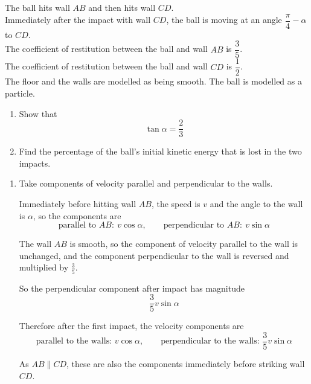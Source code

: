 \documentclass[leqno]{article}
\begin{document}
\begin{enumerate}[
  label=\textbf{\arabic*.},
  leftmargin=*,
  topsep=0pt,
  partopsep=0pt,
  parsep=0pt
]
The ball hits wall $AB$ and then hits wall $CD$. \\

Immediately after the impact with wall $CD$, the ball is moving at an angle $\dfrac{\pi}{4}-\alpha$ to $CD$. \\

The coefficient of restitution between the ball and wall $AB$ is $\dfrac{3}{5}$. \\

The coefficient of restitution between the ball and wall $CD$ is $\dfrac{1}{2}$. \\

The floor and the walls are modelled as being smooth. The ball is modelled as a particle. \\

\begin{enumerate}[label=\textbf{(\alph*)}]
  \item Show that
  \[
  \tan\alpha=\dfrac{2}{3}
  \] 
  \item Find the percentage of the ball's initial kinetic energy that is lost in the two impacts.  \\
\end{enumerate}

\vspace*{10pt}

\begin{djsSolution}
\begin{enumerate}[label=\textbf{(\alph*)}]
  \item Take components of velocity parallel and perpendicular to the walls.

  Immediately before hitting wall \(AB\), the speed is \(v\) and the angle to the wall is \(\alpha\), so the components are
  \[
  \text{parallel to }AB: \ v\cos\alpha,
  \qquad
  \text{perpendicular to }AB: \ v\sin\alpha
  \]

  The wall \(AB\) is smooth, so the component of velocity parallel to the wall is unchanged, and the component perpendicular to the wall is reversed and multiplied by \(\frac35\).

  So the perpendicular component after impact has magnitude
  \[
  \frac35 v\sin\alpha
  \]

  Therefore after the first impact, the velocity components are
  \[
  \text{parallel to the walls: } v\cos\alpha,
  \qquad
  \text{perpendicular to the walls: } \frac35 v\sin\alpha
  \]

  As \(AB\parallel CD\), these are also the components immediately before striking wall \(CD\).


\end{enumerate}
\end{djsSolution}
\end{enumerate}
\end{document}
